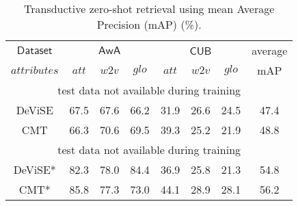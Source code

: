 {{\begin{table}[t!]
\centering
\caption{\footnotesize Transductive zero-shot retrieval using mean Average Precision (mAP) (\%).}
\vspace{1mm}
\scalebox{0.72}
{
\begin{tabular}{|c||lll||lll||c|}
\hline
$\mathsf{Dataset}$ & \multicolumn{3}{c||}{$\mathsf{AwA}$}                                                      & \multicolumn{3}{c||}{$\mathsf{CUB}$}                                                     & average                          \\
                    $\textit{attributes}$    & \multicolumn{1}{c}{$\textit{att}$} & \multicolumn{1}{c}{$\textit{w2v}$} & \multicolumn{1}{c||}{$\textit{glo}$} & \multicolumn{1}{c}{$\textit{att}$} & \multicolumn{1}{c}{$\textit{w2v}$} & \multicolumn{1}{c||}{$\textit{glo}$} & mAP \\ \hline\hline
\multicolumn{8}{|c|}{test data not available during training}                                                                                                                                                                                     \\ \hline \hline
DeViSE \cite{frome2013devise}                  &              67.5            &             67.6           &         66.2                 &            31.9             &           26.6              &           24.5               &        47.4              \\
CMT \cite{socher2013zero}                    &              66.3            &             70.6            &         69.5                 &             39.3            &             25.2            &           21.9              &     48.8                       \\ \hline \hline
\multicolumn{8}{|c|}{test data not available during training}                                                                                                                                                                                        \\ \hline \hline
DeViSE* \cite{frome2013devise}                &              82.3            &              78.0          &        84.4                  &             36.9            &            25.8             &             21.3             &       54.8               \\
CMT* \cite{socher2013zero}                   &              85.8            &             77.3            &       73.0                   &              44.1           &            28.9             &             28.1            &     56.2                     \\

\end{tabular}}
\end{table}}}
